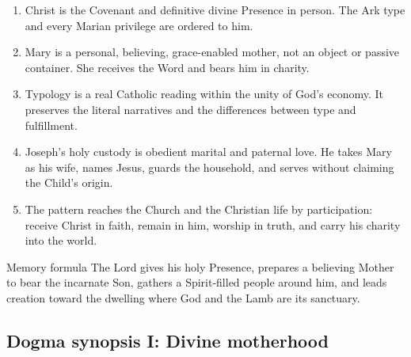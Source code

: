 \begin{enumerate}
  \item Christ is the Covenant and definitive divine Presence in person.  The
  Ark type and every Marian privilege are ordered to him.
  \item Mary is a personal, believing, grace-enabled mother, not an object or
  passive container.  She receives the Word and bears him in charity.
  \item Typology is a real Catholic reading within the unity of God's economy.
  It preserves the literal narratives and the differences between type and
  fulfillment.
  \item Joseph's holy custody is obedient marital and paternal love.  He takes
  Mary as his wife, names Jesus, guards the household, and serves without
  claiming the Child's origin.
  \item The pattern reaches the Church and the Christian life by participation:
  receive Christ in faith, remain in him, worship in truth, and carry his
  charity into the world.
\end{enumerate}

\begin{studybox}{Memory formula}
The Lord gives his holy Presence, prepares a believing Mother to bear the
incarnate Son, gathers a Spirit-filled people around him, and leads creation
toward the dwelling where God and the Lamb are its sanctuary.
\end{studybox}

\clearpage
\subsection*{Dogma synopsis I: Divine motherhood}

